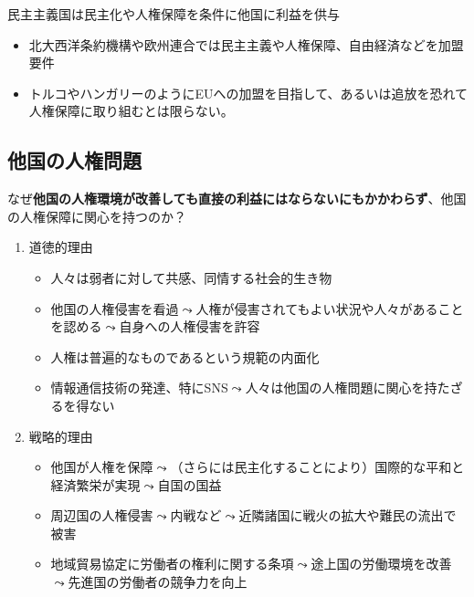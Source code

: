 \documentclass[
  xelatex,
  ja=standard]{bxjsarticle}
\providecommand{\tightlist}{%
  \setlength{\itemsep}{0pt}\setlength{\parskip}{0pt}}\usepackage{longtable,booktabs,array}
\begin{document}
民主主義国は民主化や人権保障を条件に他国に利益を供与

\begin{itemize}
\tightlist
\item
  北大西洋条約機構や欧州連合では民主主義や人権保障、自由経済などを加盟要件
\item
  トルコやハンガリーのようにEUへの加盟を目指して、あるいは追放を恐れて人権保障に取り組むとは限らない。
\end{itemize}

\hypertarget{ux4ed6ux56fdux306eux4ebaux6a29ux554fux984c}{%
\subsection{他国の人権問題}\label{ux4ed6ux56fdux306eux4ebaux6a29ux554fux984c}}

なぜ\textbf{他国の人権環境が改善しても直接の利益にはならないにもかかわらず}、他国の人権保障に関心を持つのか？

\begin{enumerate}
\def\labelenumi{\arabic{enumi}.}
\tightlist
\item
  道徳的理由

  \begin{itemize}
  \tightlist
  \item
    人々は弱者に対して共感、同情する社会的生き物
  \item
    他国の人権侵害を看過\(\leadsto\)人権が侵害されてもよい状況や人々があることを認める\(\leadsto\)自身への人権侵害を許容
  \item
    人権は普遍的なものであるという規範の内面化
  \item
    情報通信技術の発達、特にSNS\(\leadsto\)人々は他国の人権問題に関心を持たざるを得ない
  \end{itemize}
\item
  戦略的理由

  \begin{itemize}
  \tightlist
  \item
    他国が人権を保障\(\leadsto\)（さらには民主化することにより）国際的な平和と経済繁栄が実現\(\leadsto\)自国の国益
  \item
    周辺国の人権侵害\(\leadsto\)内戦など\(\leadsto\)近隣諸国に戦火の拡大や難民の流出で被害
  \item
    地域貿易協定に労働者の権利に関する条項\(\leadsto\)途上国の労働環境を改善\(\leadsto\)先進国の労働者の競争力を向上\citep{hafner2005a}
  \end{itemize}
\end{enumerate}
\end{document}
